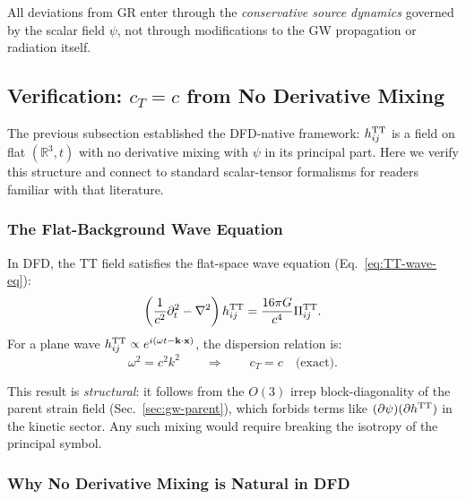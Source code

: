 All deviations from GR enter through the \textit{conservative source dynamics} governed by the scalar field $\psi$, not through modifications to the GW propagation or radiation itself.

\subsection{Verification: $c_T = c$ from No Derivative Mixing}\label{sec:gw-ct-proof}

The previous subsection established the DFD-native framework: $h_{ij}^{\rm TT}$ is a field on flat $(\mathbb{R}^3, t)$ with no derivative mixing with $\psi$ in its principal part. Here we verify this structure and connect to standard scalar-tensor formalisms for readers familiar with that literature.

\subsubsection{The Flat-Background Wave Equation}

In DFD, the TT field satisfies the flat-space wave equation (Eq.~\ref{eq:TT-wave-eq}):
\begin{equation}
\left(\frac{1}{c^2}\partial_t^2 - \nabla^2\right)h_{ij}^{\rm TT} = \frac{16\pi G}{c^4}\Pi_{ij}^{\rm TT}.
\end{equation}
For a plane wave $h_{ij}^{\rm TT} \propto e^{i(\omega t - \mathbf{k}\cdot\mathbf{x})}$, the dispersion relation is:
\begin{equation}\label{eq:dispersion-exact}
\omega^2 = c^2 k^2 \qquad \Rightarrow \qquad c_T = c \quad \text{(exact)}.
\end{equation}

This result is \textit{structural}: it follows from the $O(3)$ irrep block-diagonality of the parent strain field (Sec.~\ref{sec:gw-parent}), which forbids terms like $(\partial\psi)(\partial h^{\rm TT})$ in the kinetic sector. Any such mixing would require breaking the isotropy of the principal symbol.

\subsubsection{Why No Derivative Mixing is Natural in DFD}

